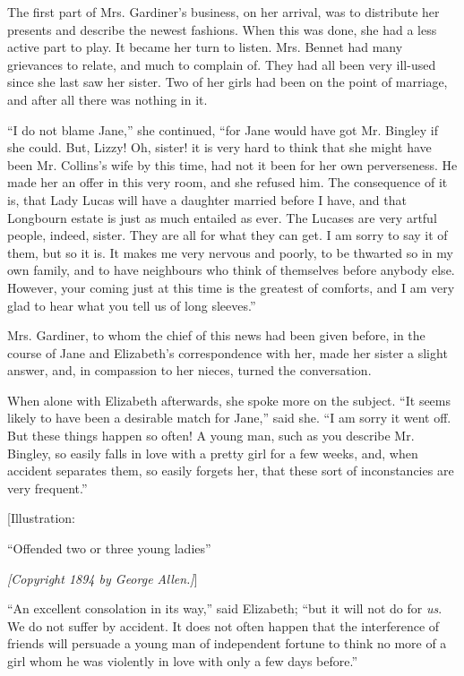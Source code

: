 \documentclass[12pt]{book}
\begin{document}
The first part of Mrs. Gardiner's business, on her arrival, was to distribute her presents and describe the newest fashions. When this was done, she had a less active part to play. It became her turn to listen. Mrs. Bennet had many grievances to relate, and much to complain of. They had all been very ill-used since she last saw her sister. Two of her girls had been on the point of marriage, and after all there was nothing in it.

``I do not blame Jane,'' she continued, ``for Jane would have got Mr. Bingley if she could. But, Lizzy! Oh, sister! it is very hard to think that she might have been Mr. Collins's wife by this time, had not it been for her own perverseness. He made her an offer in this very room, and she refused him. The consequence of it is, that Lady Lucas will have a daughter married before I have, and that Longbourn estate is just as much entailed as ever. The Lucases are very artful people, indeed, sister. They are all for what they can get. I am sorry to say it of them, but so it is. It makes me very nervous and poorly, to be thwarted so in my own family, and to have neighbours who think of themselves before anybody else. However, your coming just at this time is the greatest of comforts, and I am very glad to hear what you tell us of long sleeves.''

Mrs. Gardiner, to whom the chief of this news had been given before, in the course of Jane and Elizabeth's correspondence with her, made her sister a slight answer, and, in compassion to her nieces, turned the conversation.

When alone with Elizabeth afterwards, she spoke more on the subject. ``It seems likely to have been a desirable match for Jane,'' said she. ``I am sorry it went off. But these things happen so often! A young man, such as you describe Mr. Bingley, so easily falls in love with a pretty girl for a few weeks, and, when accident separates them, so easily forgets her, that these sort of inconstancies are very frequent.''

[Illustration:

``Offended two or three young ladies''

\emph{[\textit{Copyright 1894 by George Allen.}]}]

``An excellent consolation in its way,'' said Elizabeth; ``but it will not do for \textit{us}. We do not suffer by accident. It does not often happen that the interference of friends will persuade a young man of independent fortune to think no more of a girl whom he was violently in love with only a few days before.''
\end{document}
